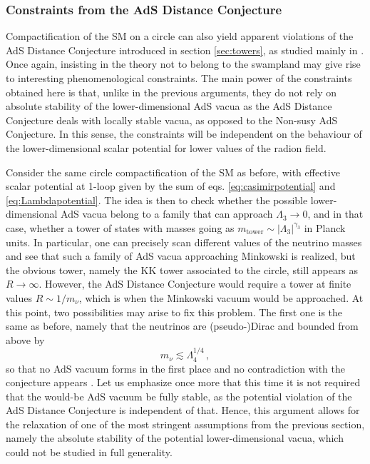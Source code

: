 \documentclass[11pt,a4paper]{article}
\begin{document}
\subsubsection*{Constraints from the AdS Distance Conjecture}

Compactification of the SM on a circle can also yield apparent violations of the AdS Distance Conjecture introduced in section \ref{sec:towers}, as studied mainly in \cite{Gonzalo:2021fma,Gonzalo:Toappear}. Once again, insisting in the theory not to belong to the swampland may give rise to interesting phenomenological constraints. The main power of the constraints obtained here is that, unlike in the previous arguments, they do not rely on absolute stability of the lower-dimensional AdS vacua as the AdS Distance Conjecture deals with locally stable vacua, as opposed to the Non-susy AdS Conjecture. In this sense, the constraints will be independent on the behaviour of the lower-dimensional scalar potential for lower values of the radion field.

Consider the same circle compactification of the SM as before, with effective scalar potential at 1-loop given by the sum of eqs. \eqref{eq:casimirpotential} and \eqref{eq:Lambdapotential}. The idea is then to check whether the possible lower-dimensional AdS vacua belong to a family that can approach $\Lambda_{3} \rightarrow 0$, and in that case, whether a tower of states with masses going as $m_{\mathrm{tower}}\sim |\Lambda_3|^{\gamma_3}$ in Planck units. In particular, one can precisely scan different values of the neutrino masses and see that such a family of AdS vacua approaching Minkowski is realized, but the obvious tower, namely the KK tower associated to the circle, still appears as $R\rightarrow \infty$.  However,  the AdS Distance Conjecture would require a tower at finite values $R\sim 1/m_{\nu}$, which is when the Minkowski vacuum would be approached. At this point, two possibilities may arise to fix this problem. The first one is the same as before, namely that the neutrinos are \mbox{(pseudo-)Dirac} and  bounded from  above by 
\begin{equation}
\label{eq:neutrinoboundADC}
m_{\nu}\lesssim \Lambda_{4}^{1/4} \, ,
\end{equation}
so that no AdS vacuum forms in the first place and no contradiction with the conjecture appears \cite{Gonzalo:2021fma,Gonzalo:Toappear,GonzaloStrings}. Let us emphasize once more that this time it is not required that the would-be AdS vacuum be fully stable, as the potential violation of the AdS Distance Conjecture is independent of that. Hence, this argument allows for the relaxation of one of the most stringent assumptions from the previous section, namely the absolute stability of the potential lower-dimensional vacua, which could not be studied in full generality.
\end{document}
